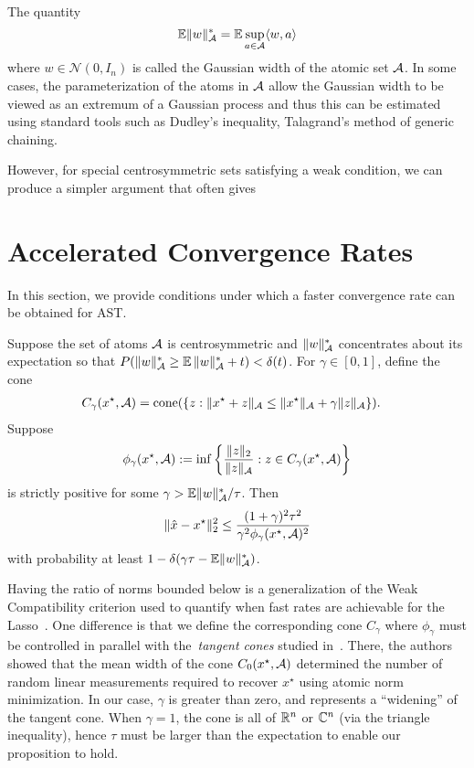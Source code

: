 The quantity 
\[
	\operatorname{\mathbb{E}}\lVert w\rVert_{\mathcal{A}}^* = \operatorname{\mathbb{E}}\sup_{a \in \mathcal{A}} \langle w, a\rangle
\]
where $w \in \mathcal{N}(0,I_n)$ is called the Gaussian width of the atomic set $\mathcal{A}$. In some cases, the parameterization of the atoms in $\mathcal{A}$ allow the Gaussian width to be viewed as an extremum of a Gaussian process and thus this can be estimated using standard tools such as Dudley's inequality, Talagrand's method of generic chaining.

However, for special centrosymmetric sets satisfying a weak condition, we can produce a simpler argument that often gives 

\section{Accelerated Convergence Rates} %
\label{sec:convergence-rate}
In this section, we provide conditions under which a faster convergence rate
can be obtained for AST.
\begin{prop}
Suppose the set of atoms $\mathcal{A}$ is centrosymmetric and $\lVert w\rVert_{\mathcal{A}}^*$
concentrates about its expectation so that $P( {\lVert w\rVert_{\mathcal{A}}^*} \geq
\operatorname{\mathbb{E}}{\lVert w\rVert_{\mathcal{A}}^*}+t) < \delta(t)$. For $\gamma \in [0, 1]$, define the cone
\begin{align*}
C_\gamma(x^\star,\mathcal{A}) &= \operatorname{cone}(\{z:\lVert x^\star+ z\rVert_{\mathcal{A}} \leq \lVert x^\star\rVert_{\mathcal{A}} + \gamma\lVert z\rVert_{\mathcal{A}}\}).
\end{align*}
Suppose 
\begin{equation}
\label{eq:compatibility}
\phi_\gamma(x^\star,\mathcal{A}) := \inf \left\{ \frac{\lVert z\rVert_{2}}{\lVert z\rVert_{\mathcal{A}}}  : z \in C_\gamma(x^\star,\mathcal{A}) \right\} 
\end{equation}
is strictly positive for some $\gamma > {\operatorname{\mathbb{E}}\lVert w\rVert_{\mathcal{A}}^*}/{\tau}$. Then
\begin{equation}
\label{eq:fast_rate_phi}
\lVert\hat{x}-x^\star\rVert_2^2  \leq \frac{(1+\gamma)^2 \tau^2}{\gamma^2 \phi_\gamma(x^\star,\mathcal{A})^2}
\end{equation}
with probability at least $1-\delta(\gamma\tau - \operatorname{\mathbb{E}}\lVert w\rVert_{\mathcal{A}}^*)$.
\end{prop}

Having the ratio of norms bounded below is a generalization of the Weak
Compatibility criterion used to quantify when fast rates are achievable for the
Lasso~\cite{degeer}. One difference is that we define the corresponding
cone $C_\gamma$ where $\phi_\gamma$ must be controlled in parallel with
the~\emph{tangent cones} studied in~\cite{crpw}. There, the authors showed that
the mean width of the cone $C_0(x^\star,\mathcal{A})$ determined the number of random
linear measurements required to recover $x^\star$ using atomic norm
minimization.	 In our case, $\gamma$ is greater than zero, and represents a
``widening'' of the tangent cone. When $\gamma=1$, the cone is all of $\mathbb{R}^n$ or $\mathbb{C}^n$
(via the triangle inequality), hence $\tau$ must be larger than the
expectation to enable our proposition to hold.

